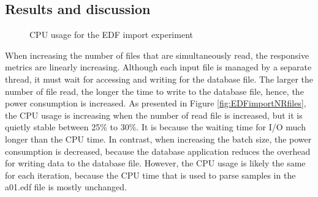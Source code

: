 \subsection{Results and discussion}
\begin{figure}
        \centering 
        \caption{CPU usage for the EDF import experiment}
        \label{fig:Figures/EDFIMPORT}
\end{figure}
When increasing the number of files that are simultaneously read, the responsive metrics are linearly increasing. Although each input file is managed by a separate thread, it must wait for accessing and writing for the database file. The larger the number of file read, the longer the time to write to the database file, hence, the power consumption is increased. As presented in Figure \ref{fig:EDFimportNRfiles}, the CPU usage is increasing when the number of read file is increased, but it is quietly stable between 25\% to 30\%. It is because the waiting time for I/O much longer than the CPU time. In contrast, when increasing the batch size, the power consumption is decreased, because the database application reduces the overhead for writing data to the database file. However, the CPU usage is likely the same for each iteration, because the CPU time that is used to parse samples in the a01.edf file is mostly unchanged.\\
